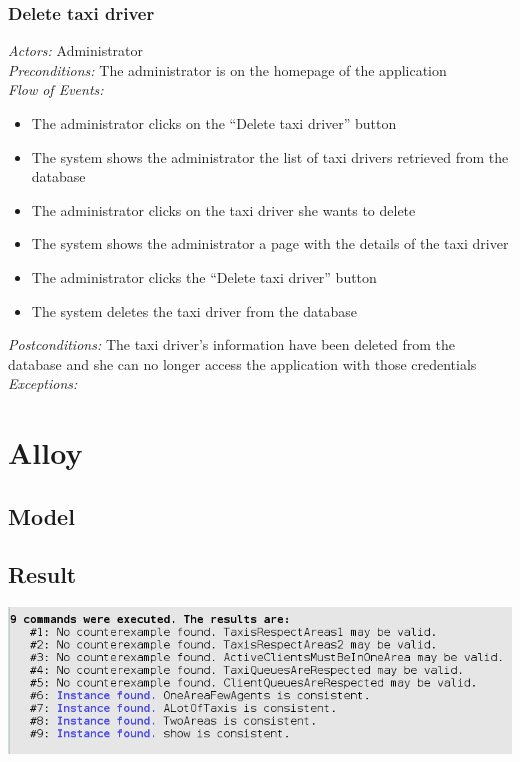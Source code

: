 \documentclass{article}
\begin{document}
\subsubsection{Delete taxi driver}
\textit{Actors:} Administrator
\\\textit{Preconditions:} The administrator is on the homepage of the application
\\\textit{Flow of Events:}
\begin{itemize}
	\item  The administrator clicks on the ``Delete taxi driver'' button
	\item  The system shows the administrator the list of taxi drivers retrieved from the database
	\item  The administrator clicks on the taxi driver she wants to delete
	\item  The system shows the administrator a page with the details of the taxi driver
	\item  The administrator clicks the ``Delete taxi driver'' button
	\item  The system deletes the taxi driver from the database
\end{itemize}
\textit{Postconditions:} The taxi driver's information have been deleted from the database and she can no longer access the application with those credentials
\\\textit{Exceptions:}
\clearpage
\section{Alloy}
\subsection{Model}
\texttt{}	
\subsection{Result}
\begin{center}
	\includegraphics[width=.9\textwidth,height=.9\textheight,keepaspectratio]{AlloyChecks}
\end{center}
\end{document}
